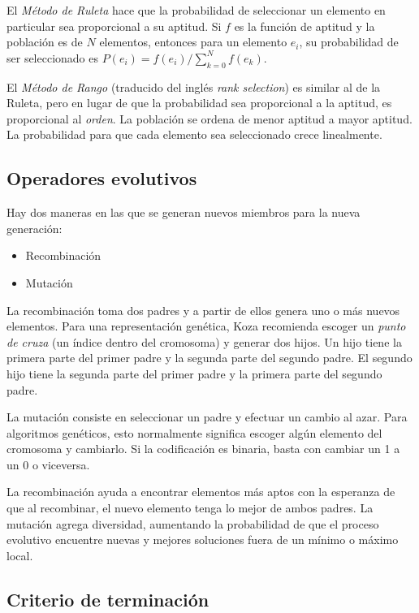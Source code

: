 El \emph{Método de Ruleta} hace que la probabilidad de seleccionar un elemento en
particular sea proporcional a su aptitud. Si $f$ es la función de aptitud y la
población es de $N$ elementos, entonces para un elemento $e_i$, su probabilidad
de ser seleccionado es $P(e_i) = f(e_i) / \sum_{k=0}^{N} f(e_k)$.

El \emph{Método de Rango} (traducido del inglés \emph{rank selection}) es similar al
de la Ruleta, pero en lugar de que la probabilidad sea proporcional a la
aptitud, es proporcional al \emph{orden}. La población se ordena de menor
aptitud a mayor aptitud. La probabilidad para que cada elemento sea
seleccionado crece linealmente.

\subsection { Operadores evolutivos }

Hay dos maneras en las que se generan nuevos miembros para la nueva generación:

\begin{itemize}
      \item Recombinación
      \item Mutación
\end{itemize}

La recombinación toma dos padres y a partir de ellos genera uno o más nuevos
elementos. Para una representación genética, Koza \cite{koza} recomienda
escoger un \emph{punto de cruza} (un índice dentro del cromosoma) y generar dos
hijos. Un hijo tiene la primera parte del primer padre y la segunda parte del
segundo padre. El segundo hijo tiene la segunda parte del primer padre y la
primera parte del segundo padre.

La mutación consiste en seleccionar un padre y efectuar un cambio al azar. Para
algoritmos genéticos, esto normalmente significa escoger algún elemento del
cromosoma y cambiarlo. Si la codificación es binaria, basta con cambiar un 1 a
un 0 o viceversa.

La recombinación ayuda a encontrar elementos más aptos con la esperanza de que
al recombinar, el nuevo elemento tenga lo mejor de ambos padres. La mutación
agrega diversidad, aumentando la probabilidad de que el proceso evolutivo
encuentre nuevas y mejores soluciones fuera de un mínimo o máximo local.

\subsection { Criterio de terminación }

